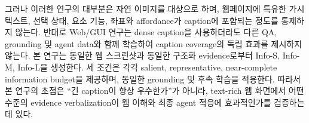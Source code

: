 그러나 이러한 연구의 대부분은 자연 이미지를 대상으로 하며, 웹페이지에
특유한 가시 텍스트, 선택 상태, 요소 기능, 좌표와 affordance가 caption에
포함되는 정도를 통제하지 않는다. 반대로 Web/GUI 연구는 dense caption을
사용하더라도 다른 QA, grounding 및 agent data와 함께 학습하여 caption
coverage의 독립 효과를 제시하지 않는다. 본 연구는 동일한 웹 스크린샷과
동일한 구조화 evidence로부터 Info-S, Info-M, Info-L을 생성한다.
세 조건은 각각 salient, representative, near-complete information
budget을 제공하며, 동일한 grounding 및 후속 학습을 적용한다. 따라서
본 연구의 초점은 ``긴 caption이 항상 우수한가''가 아니라, text-rich
웹 화면에서 어떤 수준의 evidence verbalization이 웹 이해와 최종 agent
적응에 효과적인가를 검증하는 데 있다.
